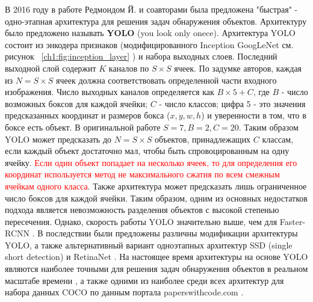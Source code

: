 \documentclass[12pt]{article}
\begin{document}
\begin{sloppypar}

В 2016 году в работе \cite{redmon2016you} Редмондом Й. и соавторами была предложена "быстрая" - одно-этапная архитектура для решения задач обнаружения объектов. Архитектуру было предложено называть \textbf{YOLO} (you look only onece). Архитектура YOLO состоит из энкодера признаков (модифицированного Inception GoogLeNet см. рисунок ~\ref{ch1:fig:inception_layer} \cite{szegedy2015going} ) и набора выходных слоев. Последний выходной слой содержит $K$ каналов по $S\times S$ ячеек. По задумке авторов, каждая из $N = S\times S$ ячеек должна соответствовать определенной части входного изображения. Число выходных каналов определяется как $B\times5+C$, где $B$ - число возможных боксов для каждой ячейки; $C$ - число классов; цифра 5 - это значения предсказанных координат и размеров бокса ($x,y,w,h$) и уверенности в том, что в боксе есть объект. В оригинальной работе $S=7, B=2, C=20$. Таким образом YOLO может предсказать до  $N = S\times S$ объектов, принадлежащих $C$ классам, если каждый объект достаточно мал, чтобы быть спровоцированным на одну ячейку. 
\textcolor{red}{
Если один объект попадает на несколько ячеек, то для определения его координат используется метод не максимального сжатия по всем смежным ячейкам одного класса}. Также архитектура может предсказать лишь ограниченное число боксов для каждой ячейки. Таким образом, одним из основных недостатков подхода является невозможность разделения объектов с высокой степенью пересечения. Однако, скорость работы YOLO значительно выше, чем для Faster-RCNN \cite{Hui2018Real}. В последствии были предложены различны модификации архитектуры YOLO\cite{Hui2018Real}, а также альтернативный вариант одноэтапных архитектур SSD (single short detection) \cite{liu2016ssd} и RetinaNet \cite{lin2017focal}. На настоящее время архитектуры на основе YOLO являются наиболее точными для решения задач обнаружения объектов в реальном масштабе времени 
\cite{paperswithcode2021RealObj}, а также одними из наиболее  среди всех архитектур для набора данных COCO по данным портала paperswithcode.com \cite{paperswithcodeCOCOdet}.


\end{sloppypar}
\end{document}
